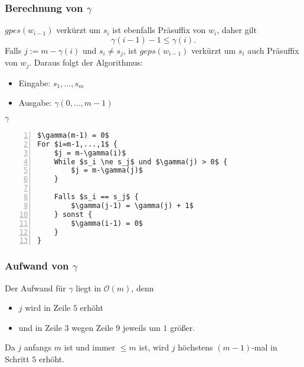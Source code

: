 \subsubsection{Berechnung von \(\gamma\)}
\(gpes(w_{i-1})\) verkürzt um \(s_i\) ist ebenfalls Präsuffix von \(w_i\), daher gilt
\[\gamma(i-1) -1 \leq \gamma(i).\]
Falls \(j := m-\gamma(i)\) und \(s_i \ne s_j\), ist \(geps(w_{i-1})\) verkürzt um \(s_i\) auch Präsuffix von \(w_j\). Daraus folgt der Algorithmus:
\begin{itemize}
	\item Eingabe: \(s_1,...,s_m\)
	\item Ausgabe: \(\gamma(0,...,m-1)\)
\end{itemize}

\begin{minipage}{\textwidth}
\(\gamma\)
\begin{lstlisting}[frame=single,numbers=left,mathescape]
$\gamma(m-1) = 0$
For $i=m-1,...,1$ {
	$j = m-\gamma(i)$
	While $s_i \ne s_j$ und $\gamma(j) > 0$ {
		$j = m-\gamma(j)$
	}

	Falls $s_i == s_j$ {
		$\gamma(j-1) = \gamma(j) + 1$
	} sonst {
		$\gamma(i-1) = 0$
	}
}
\end{lstlisting}
\end{minipage}

\subsubsection{Aufwand von \(\gamma\)}
Der Aufwand für \(\gamma\) liegt in \(\mathcal{O}(m)\), denn
\begin{itemize}
	\item \(j\) wird in Zeile \(5\) erhöht
	\item und in Zeile \(3\) wegen Zeile \(9\) jeweils um \(1\) größer.
\end{itemize}
Da \(j\) anfangs \(m\) ist und immer \(\leq m\) ist, wird \(j\) höchstens \((m-1)\)-mal in Schritt \(5\) erhöht.

